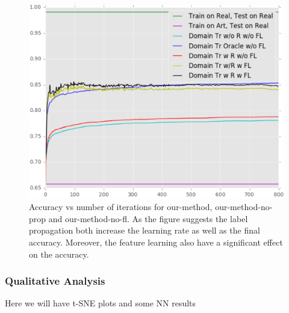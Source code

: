 \begin{figure}[ht]
\includegraphics[width=\columnwidth]{figure_1fl}
\caption{Accuracy vs number of iterations for our-method, our-method-no-prop and our-method-no-fl. As the figure suggests the label propagation both increase the learning rate as well as the final accuracy. Moreover, the feature learning also have a significant effect on the accuracy.}
\label{fllprop}
\end{figure}

\subsubsection{Qualitative Analysis}
Here we will have t-SNE plots and some NN results

